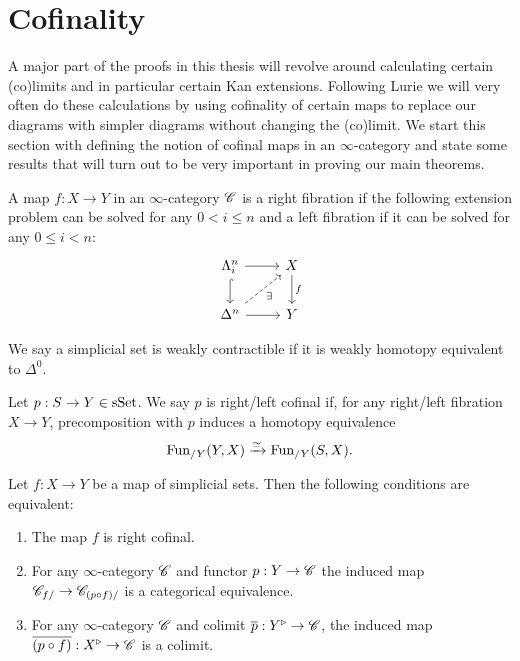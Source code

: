 \documentclass[../../thesis.tex]{subfiles}
\begin{document}
\section{Cofinality}
A major part of the proofs in this thesis will revolve around calculating certain (co)limits and in particular certain Kan extensions.
Following Lurie we will very often do these calculations by using cofinality of certain maps to replace our diagrams with simpler diagrams without changing the (co)limit.
We start this section with defining the notion of cofinal maps in an $\infty$-category and state some results that will turn out to be very important in proving our main theorems.
\begin{definition}
    A map $f: X \to Y$ in an $\infty$-category $\mathscr{C}$ is a right fibration if the following extension problem can be solved for any $0<i\leq n$ and a left fibration if it can be solved for any $0\leq i <n$:
    \[\begin{tikzcd}
            {\Lambda_i^n} & X \\
            {\Delta^n} & Y
            \arrow[from=1-1, to=1-2]
            \arrow[hook, from=1-1, to=2-1]
            \arrow[from=2-1, to=2-2]
            \arrow["f", from=1-2, to=2-2]
            \arrow["\exists"', dashed, from=2-1, to=1-2]
        \end{tikzcd}\]
\end{definition}
\begin{definition}
    We say a simplicial set is weakly contractible if it is weakly homotopy equivalent to $\Delta^0$.
\end{definition}
\begin{definition}{\cite[\href{https://kerodon.net/tag/02N1}{Definition 02N1}]{kerodon}}
    Let \(p:S\to Y \in \mathrm{sSet} \). We say $p$ is right/left cofinal if, for any right/left fibration $X\to Y$, precomposition with $p$ induces a homotopy equivalence
    \[
        \mathrm{Fun}_{/Y}(Y,X) \xrightarrow{\simeq} \mathrm{Fun}_{/Y}(S,X).
    \]
\end{definition}
\begin{proposition}
    Let $f: X \to Y$ be a map of simplicial sets.
    Then the following conditions are equivalent:
    \begin{enumerate}
        \item The map $f$ is right cofinal.
        \item For any $\infty$-category $\mathscr{C}$ and functor $p: Y \to \mathscr{C}$ the induced map $\mathscr{C}_{f/} \to \mathscr{C}_{(p \circ f)/}$ is a categorical equivalence.
        \item For any $\infty$-category $\mathscr{C}$ and colimit $\overline{p}: Y^{\triangleright} \to \mathscr{C}$, the induced map $\overline{(p \circ f)}: X^{\triangleright}\to \mathscr{C}$ is a colimit.
    \end{enumerate}
\end{proposition}
\end{document}
